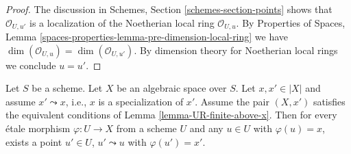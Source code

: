 \begin{proof}
The discussion in Schemes, Section \ref{schemes-section-points}
shows that $\mathcal{O}_{U, u'}$ is a localization of
the Noetherian local ring $\mathcal{O}_{U, u}$.
By Properties of Spaces, Lemma
\ref{spaces-properties-lemma-pre-dimension-local-ring}
we have $\dim(\mathcal{O}_{U, u}) = \dim(\mathcal{O}_{U, u'})$.
By dimension theory for Noetherian local rings we conclude $u = u'$.
\end{proof}

\begin{lemma}
\label{lemma-specialization}
Let $S$ be a scheme.
Let $X$ be an algebraic space over $S$.
Let $x, x' \in |X|$ and assume $x' \leadsto x$, i.e., $x$ is a
specialization of $x'$.
Assume the pair $(X, x')$ satisfies the equivalent conditions
of Lemma \ref{lemma-UR-finite-above-x}.
Then for every \'etale morphism $\varphi : U \to X$ from a scheme $U$ and any
$u \in U$ with $\varphi(u) = x$, exists a point $u'\in U$,
$u' \leadsto u$ with $\varphi(u') = x'$.
\end{lemma}

